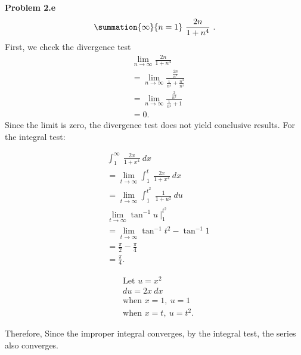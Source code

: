 \documentclass{report}
\begin{document}
    \bigbreak \noindent 
    \textbf{Problem 2.e}
    \begin{align*}
        \summation{\infty}{n=1}\ \frac{2n}{1+n^{4}}\ 
    .\end{align*}
    \bigbreak \noindent 
    First, we check the divergence test
    \begin{align*}
        &\lim\limits_{n \to \infty}{\frac{2n}{1+n^{4}}} \\
        &=\lim\limits_{n \to \infty}{\frac{\frac{2n}{n^{4}}}{\frac{1}{n^{4}}+\frac{n^{4}}{n^{4}}}} \\
        &=\lim\limits_{n \to \infty}{\frac{\frac{2}{n^{3}}}{\frac{1}{n^{4}} + 1}} \\
        &= 0
    .\end{align*}
    Since the limit is zero, the divergence test does not yield conclusive results. For the integral test:
    \bigbreak \noindent 
    \begin{minipage}[t]{0.47\textwidth}
    \begin{align*}
        &\int_{1}^{\infty}\ \frac{2x}{1+x^{4}}\ dx \\
        &=\lim\limits_{t \to \infty}{\int_{1}^{t}\ \frac{2x}{1+x^{4}}\ dx} \\
        &=\lim\limits_{t \to \infty}{\int_{1}^{t^{2}}\ \frac{1}{1+u^{2}}\ du} \\
        &\lim\limits_{t \to \infty}{\tan^{-1}{u}}\ \bigg|_1^{t^{2}} \\
        &=\lim\limits_{t \to \infty}{\tan^{-1}{t^{2}}} - \tan^{-1}{1} \\
        &= \frac{\pi}{2} - \frac{\pi}{4} \\
        &=\frac{\pi}{4}
    .\end{align*}
    \end{minipage}
        \begin{minipage}[t]{0.47\textwidth}
        \begin{align*}
            &\text{Let $u=x^{2}$} \\
            &du = 2x\ dx \\
            &\text{when } x = 1,\ u= 1 \\
            &\text{when } x = t,\ u=t^{2} 
        .\end{align*}
    \end{minipage}
    \bigbreak \noindent 
    Therefore, Since the improper integral converges, by the integral test, the series also converges.


    



    
    
\end{document}

